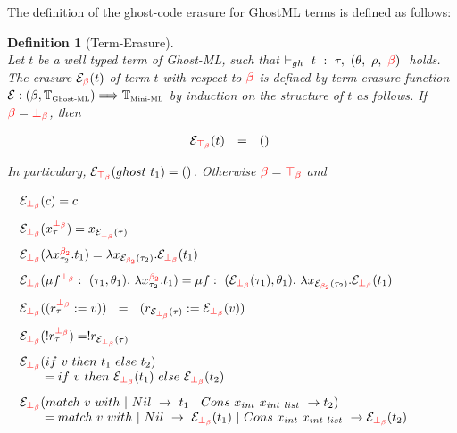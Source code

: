 \documentclass[a4paper,11pt,oneside]{article}
\theoremstyle{plain}
\newtheorem{definition}{Definition}[subsection]
\newcommand{\rouge}[1]{\textcolor{red}{#1}}
\newcommand{\ghosttyping}[6]{\vdash_{gh}~#1~:~#2,~(#3,~#4,~\rouge{#5})~\textcolor{blue}{\boldsymbol{#6}}}
\newcommand{\gb}{\beta}
\newcommand{\gba}[1]{\beta_{#1}}
\newcommand{\gbb}{\bot_\beta}
\newcommand{\gbt}{\top_\beta}
\newcommand{\gbr}{\textcolor{red}{\gb}}
\newcommand{\gbra}[1]{\textcolor{red}{\gba{#1}}}
\newcommand{\gbbr}{\textcolor{red}{\gbb}}
\newcommand{\gbtr}{\textcolor{red}{\gbt}}
\newcommand{\e}{\mathcal{E}}
\newcommand{\ebot}[1]{\e_{\gbbr}(#1)}
\newcommand{\etop}[1]{\e_{\gbtr}(#1)}
\newcommand{\egbra}[2]{\e_{\gbra{#1}}(#2)}
\begin{document}
The definition of the ghost-code erasure for GhostML terms is defined as follows:
\begin{definition}[Term-Erasure] 
\label{term-erasure}
\hypertarget{term-erasure}{}
~\\
Let $t$ be a well typed term of Ghost-ML, such that 
$\ghosttyping
	{t}
	{\tau}
	{\theta}
	{\rho}
	{\gbr}
	{}$ holds.
The erasure $\e_{\gbr}(t)$ of term $t$ with respect to $\gbr$ is defined by term-erasure function $\e: (\beta, \mathbb{T}_{\text{\tiny Ghost-ML}}) \Longrightarrow \mathbb{T}_{\text{\tiny Mini-ML}}$ by induction on the structure of $t$ as follows.
If $\gbr = \gbbr$, then
\begin{small}
\begin{adjustwidth}{0cm}{0cm}
\begin{displaymath} 
\begin{array}{lllr}
~~ \etop{t} &=& () & 
\end{array}
\end{displaymath}
\end{adjustwidth}
\end{small}
In particulary, $\etop{ghost~t_1} = ()$. Otherwise $\gbr = \gbtr$ and  
\begin{small}
\begin{adjustwidth}{0cm}{0cm}
\begin{displaymath} 
\begin{array}{llll}
\ebot{c} =c &  & &\\[0.3cm]

\ebot{x^{\gbbr}_{\tau}} = x_{\ebot{\tau}} &  & &\\[0.3cm]

\ebot{\lambda x^{\gbra{2}}_{\tau_2} . t_1} =  
\lambda x_{\egbra{2}{{\tau_2}}} . \ebot{t_1}  & & &\\[0.3cm]

\ebot{
	\mu f^{\gbbr}:~(\tau_1, \theta_1).~\lambda x^{\gbra{2}}_{\tau_2}. t_1} =
	\mu f:~(\ebot{\tau_1}, \theta_1).~\lambda x_{\egbra{2}{\tau_2}}. \ebot{t_1} & & &
	\\[0.3cm]

\ebot{(r^{\gbbr}_{\tau}:= v)} ~~ = ~~ (r_{\ebot{\tau}} := \ebot{v}) & & &  \\[0.3cm]
\ebot{!r^{\gbbr}_{\tau}} = !r_{\ebot{\tau}} & & &  \\[0.3cm]	
	
\ebot{if~v~then~t_1~else~t_2} & & & \\
\qquad = if~v~then~\ebot{t_1}~else~\ebot{t_2} & & & \\[0.3cm]
\ebot{match~v~with ~|~Nil~->~t_1~|~Cons~x_{int}~x_{int~list}~->t_2} & & & \\
\qquad = match~v~with ~|~Nil~->~\ebot{t_1}~|~Cons~x_{int}~x_{int~list}~->\ebot{t_2} & & &  
\end{array}
\end{displaymath}
\end{adjustwidth}
\end{small}


\end{definition}
\end{document}
